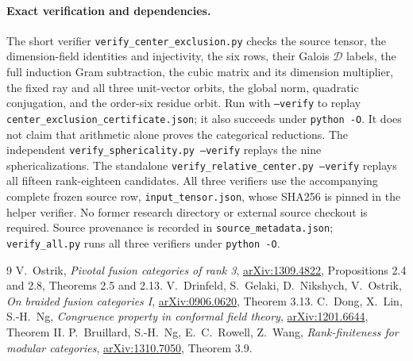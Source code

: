 \documentclass[11pt]{article}
\newcommand{\D}{\mathcal D}
\begin{document}
\paragraph{Exact verification and dependencies.}
The short verifier \texttt{verify\_center\_exclusion.py} checks the source
tensor, the dimension-field identities and injectivity, the six rows,
their Galois $\D$ labels, the full induction Gram subtraction, the cubic
matrix and its dimension multiplier, the fixed ray and all three
unit-vector orbits, the global norm, quadratic conjugation, and the
order-six residue orbit. Run with \texttt{--verify} to replay
\texttt{center\_exclusion\_certificate.json}; it also succeeds under
\texttt{python -O}. It does not claim that arithmetic alone proves the
categorical reductions.
The independent \texttt{verify\_sphericality.py --verify} replays the
nine sphericalizations. The standalone \texttt{verify\_relative\_center.py --verify} replays all
fifteen rank-eighteen candidates. All three verifiers use the accompanying
complete frozen source row, \texttt{input\_tensor.json}, whose SHA256 is
pinned in the helper verifier. No former research directory or external
source checkout is required. Source provenance is recorded in
\texttt{source\_metadata.json}; \texttt{verify\_all.py} runs all three
verifiers under \texttt{python -O}.

\begin{thebibliography}{9}
 V.~Ostrik, \emph{Pivotal fusion categories of rank 3},
\href{https://arxiv.org/abs/1309.4822}{arXiv:1309.4822},
Propositions 2.4 and 2.8, Theorems 2.5 and 2.13.
 V.~Drinfeld, S.~Gelaki, D.~Nikshych, V.~Ostrik,
\emph{On braided fusion categories I},
\href{https://arxiv.org/abs/0906.0620}{arXiv:0906.0620}, Theorem 3.13.
 C.~Dong, X.~Lin, S.-H.~Ng,
\emph{Congruence property in conformal field theory},
\href{https://arxiv.org/abs/1201.6644}{arXiv:1201.6644}, Theorem II.
 P.~Bruillard, S.-H.~Ng, E.~C.~Rowell, Z.~Wang,
\emph{Rank-finiteness for modular categories},
\href{https://arxiv.org/abs/1310.7050}{arXiv:1310.7050}, Theorem 3.9.
\end{thebibliography}
\end{document}
